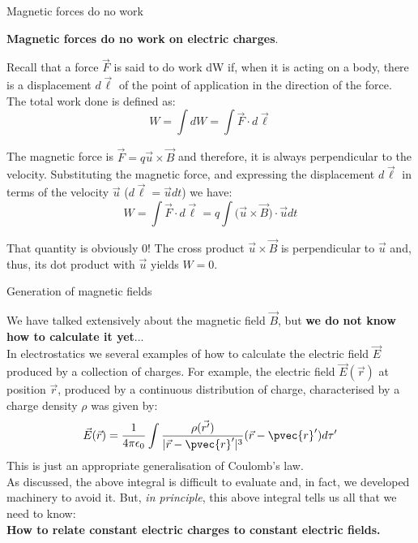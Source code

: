 \begin{frame}{Magnetic forces do no work}

{\bf Magnetic forces do no work on electric charges}.

\vspace{0.2cm}

Recall that a force $\vec{F}$ is said to do work dW if, when it is acting on a body, there is a displacement $d\vec{\ell}$
of the point of application in the direction of the force. The total work done is defined as:
\begin{equation*}
  W = \int dW = \int \vec{F} \cdot d\vec{\ell}
\end{equation*}

\vspace{0.1cm}

The magnetic force is  $\vec{F} = q \vec{u} \times \vec{B}$
and therefore, it is always perpendicular to the velocity.
Substituting the magnetic force, and expressing the displacement  $d\vec{\ell}$
in terms of the velocity $\vec{u}$ ($d\vec{\ell} = \vec{u} dt$) we have:
\begin{equation*}
  W = \int \vec{F} \cdot d\vec{\ell} = q \int \Big( \vec{u} \times \vec{B} \Big) \cdot \vec{u} dt
\end{equation*}

That quantity is obviously 0! The cross product $\vec{u} \times \vec{B}$ is perpendicular to $\vec{u}$ and,
thus, its dot product with $\vec{u}$ yields $W = 0$.
\end{frame}


%
%
%

\begin{frame}{Generation of magnetic fields}

We have talked extensively about the magnetic field $\vec{B}$,
but {\bf we do not know how to calculate it yet}...\\
\vspace{0.2cm}
In electrostatics we several examples of how to calculate the
electric field $\vec{E}$ produced by a collection of charges.
For example, the electric field $\vec{E}(\vec{r})$ at position $\vec{r}$,
produced by a continuous distribution of charge, characterised by a charge density $\rho$
was given by:
\begin{equation*}
  \vec{E}(\vec{r}) = \frac{1}{4\pi\epsilon_0} \int \frac{\rho(\vec{r^{\prime}})}{|\vec{r}-\pvec{r}'|^{3}} (\vec{r}-\pvec{r}') d\tau^{\prime}
\end{equation*}
This is just an appropriate generalisation of Coulomb's law.\\
\vspace{0.2cm}
As discussed, the above integral is difficult to evaluate and, in fact, we developed machinery to avoid it.
But, {\em in principle}, this above integral tells us all that we need to know:\\
\vspace{0.2cm}
{\bf How to relate constant electric charges to constant electric fields.}

\end{frame}

